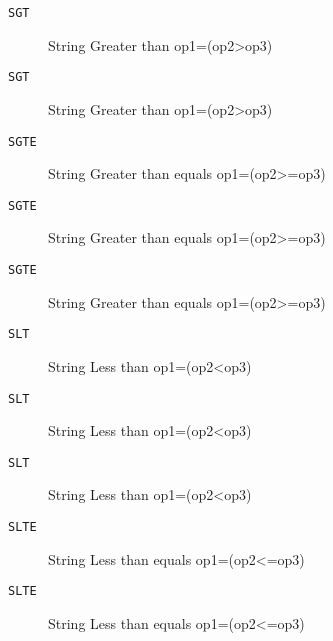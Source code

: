 \begin{description}
\item[\texttt{SGT}]  String Greater than op1=(op2>op3)\\

\end{description}
\begin{description}
\item[\texttt{SGT}]  String Greater than op1=(op2>op3)\\

\end{description}
\begin{description}
\item[\texttt{SGTE}]  String Greater than equals op1=(op2>=op3)\\

\end{description}
\begin{description}
\item[\texttt{SGTE}]  String Greater than equals op1=(op2>=op3)\\

\end{description}
\begin{description}
\item[\texttt{SGTE}]  String Greater than equals op1=(op2>=op3)\\

\end{description}
\begin{description}
\item[\texttt{SLT}]  String Less than op1=(op2<op3)\\

\end{description}
\begin{description}
\item[\texttt{SLT}]  String Less than op1=(op2<op3)\\

\end{description}
\begin{description}
\item[\texttt{SLT}]  String Less than op1=(op2<op3)\\

\end{description}
\begin{description}
\item[\texttt{SLTE}]  String Less than equals op1=(op2<=op3)\\

\end{description}
\begin{description}
\item[\texttt{SLTE}]  String Less than equals op1=(op2<=op3)\\

\end{description}
